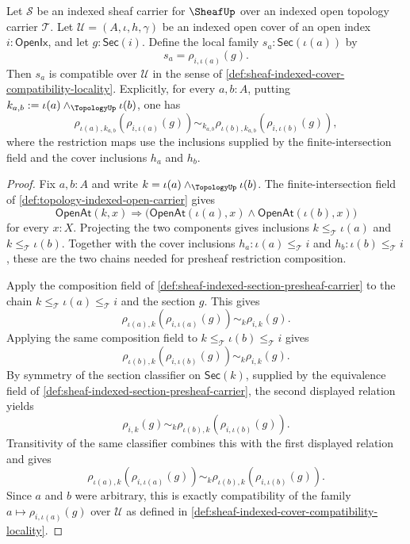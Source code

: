 \begin{theorem}
\label{thm:sheaf-global-restrictions-compatible-local-family}
Let $\mathcal{S}$ be an indexed sheaf carrier for $\SheafUp$ over an indexed open topology carrier $\mathcal{T}$. Let $\mathcal{U}=(A,\iota,h,\gamma)$ be an indexed open cover of an open index $i:\mathsf{OpenIx}$, and let $g:\mathsf{Sec}(i)$. Define the local family $s_a:\mathsf{Sec}(\iota(a))$ by
$$
s_a=\rho_{i,\iota(a)}(g).
$$
Then $s_a$ is compatible over $\mathcal{U}$ in the sense of \autoref{def:sheaf-indexed-cover-compatibility-locality}. Explicitly, for every $a,b:A$, putting $k_{a,b}:=\iota(a)\wedge_{\TopologyUp}\iota(b)$, one has
$$
\rho_{\iota(a),k_{a,b}}(\rho_{i,\iota(a)}(g))
\sim_{k_{a,b}}
\rho_{\iota(b),k_{a,b}}(\rho_{i,\iota(b)}(g)),
$$
where the restriction maps use the inclusions supplied by the finite-intersection field and the cover inclusions $h_a$ and $h_b$.
\end{theorem}
\begin{proof}
Fix $a,b:A$ and write $k=\iota(a)\wedge_{\TopologyUp}\iota(b)$. The finite-intersection field of \autoref{def:topology-indexed-open-carrier} gives
$$
\mathsf{OpenAt}(k,x)
\Longrightarrow
\bigl(\mathsf{OpenAt}(\iota(a),x)\wedge\mathsf{OpenAt}(\iota(b),x)\bigr)
$$
for every $x:X$. Projecting the two components gives inclusions $k\le_{\mathcal{T}}\iota(a)$ and $k\le_{\mathcal{T}}\iota(b)$. Together with the cover inclusions $h_a:\iota(a)\le_{\mathcal{T}} i$ and $h_b:\iota(b)\le_{\mathcal{T}} i$, these are the two chains needed for presheaf restriction composition.

Apply the composition field of \autoref{def:sheaf-indexed-section-presheaf-carrier} to the chain $k\le_{\mathcal{T}}\iota(a)\le_{\mathcal{T}}i$ and the section $g$. This gives
$$
\rho_{\iota(a),k}(\rho_{i,\iota(a)}(g))
\sim_k
\rho_{i,k}(g).
$$
Applying the same composition field to $k\le_{\mathcal{T}}\iota(b)\le_{\mathcal{T}}i$ gives
$$
\rho_{\iota(b),k}(\rho_{i,\iota(b)}(g))
\sim_k
\rho_{i,k}(g).
$$
By symmetry of the section classifier on $\mathsf{Sec}(k)$, supplied by the equivalence field of \autoref{def:sheaf-indexed-section-presheaf-carrier}, the second displayed relation yields
$$
\rho_{i,k}(g)
\sim_k
\rho_{\iota(b),k}(\rho_{i,\iota(b)}(g)).
$$
Transitivity of the same classifier combines this with the first displayed relation and gives
$$
\rho_{\iota(a),k}(\rho_{i,\iota(a)}(g))
\sim_k
\rho_{\iota(b),k}(\rho_{i,\iota(b)}(g)).
$$
Since $a$ and $b$ were arbitrary, this is exactly compatibility of the family $a\mapsto\rho_{i,\iota(a)}(g)$ over $\mathcal{U}$ as defined in \autoref{def:sheaf-indexed-cover-compatibility-locality}.
\end{proof}

